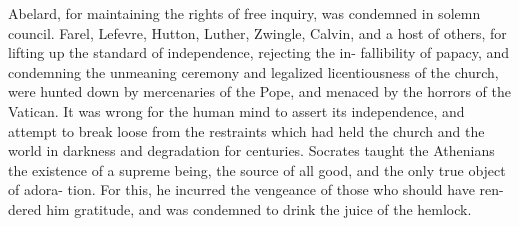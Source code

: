 \documentclass[10pt]{article}
\begin{document}
\begin{multicols}{3}
Abelard, for maintaining the rights of free inquiry, was condemned in\linebreak
solemn council. Farel, Lefevre, Hutton, Luther, Zwingle, Calvin, and a\linebreak
host of others, for lifting up the standard of independence, rejecting the in-\linebreak
fallibility of papacy, and condemning the unmeaning ceremony and\linebreak
legalized licentiousness of the church, were hunted down by mercenaries of\linebreak
the Pope, and menaced by the horrors of the Vatican. It was wrong for\linebreak
the human mind to assert its independence, and attempt to break loose from\linebreak
the restraints which had held the church and the world in darkness and\linebreak
degradation for centuries. Socrates taught the Athenians the existence of\linebreak
a supreme being, the source of all good, and the only true object of adora-\linebreak
tion. For this, he incurred the vengeance of those who should have ren-\linebreak
dered him gratitude, and was condemned to drink the juice of the hemlock.


\end{multicols}
\end{document}
